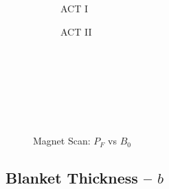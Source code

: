 \begin{figure*}[h!]
\begin{subfigure}[t]{0.45\textwidth}
\begin{adjustbox}{width=\textwidth}
      \Large
      
    \end{adjustbox}
        \caption{ACT I}
    \end{subfigure}
    \hfill
    \begin{subfigure}[t]{0.45\textwidth}
        \centering
    \begin{adjustbox}{width=\textwidth}
      \Large
      
    \end{adjustbox}
        \caption{ACT II}
    \end{subfigure}
    \hfill \hfill ~\\ ~\\ ~\\ ~\\
  \caption[]{Magnet Scan: $P_F$ vs $B_0$} ~\\
\end{figure*}


\clearpage

\newpage

\subsection*{ Blanket Thickness -- $b$ }
  \label{subsection:scan_b}

